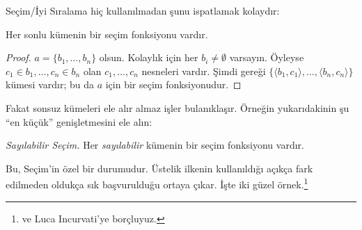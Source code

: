 \documentclass[../../../include/open-logic-section]{subfiles}
\begin{document}

Seçim/İyi Sıralama hiç kullanılmadan şunu ispatlamak kolaydır:

\begin{lem}
Her sonlu kümenin bir seçim fonksiyonu vardır.
\end{lem}

\begin{proof}
$a=\{b_1,\ldots,b_n\}$ olsun. Kolaylık için her
$b_i\neq\emptyset$ varsayın. Öyleyse
$c_1\in b_1,\ldots,c_n\in b_n$ olan $c_1,\ldots,c_n$ nesneleri vardır.
Şimdi  gereği
$\{\langle b_1,c_1\rangle,\ldots,\langle b_n,c_n\rangle\}$ kümesi
vardır; bu da $a$ için bir seçim fonksiyonudur.
\end{proof}

Fakat sonsuz kümeleri ele alır almaz işler bulanıklaşır. Örneğin
yukarıdakinin şu ``en küçük'' genişletmesini ele alın:

\begin{defish}
\emph{Sayılabilir Seçim.} Her \emph{sayılabilir} kümenin bir seçim
fonksiyonu vardır.
\end{defish}

Bu, Seçim'in özel bir durumudur. Üstelik ilkenin kullanıldığı açıkça fark
edilmeden oldukça sık başvurulduğu ortaya çıkar. İşte iki güzel
örnek.\footnote{\citet[\S9.4]{Potter2004} ve Luca Incurvati'ye borçluyuz.}
\end{document}
